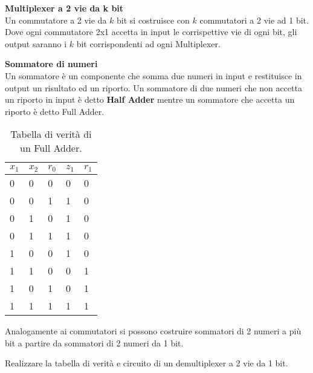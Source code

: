\begin{defn}
	\textbf{Multiplexer a 2 vie da k bit} \\
	Un commutatore a 2 vie da $ k $ bit si costruisce con $ k $ commutatori a 2
	vie ad 1 bit. Dove ogni commutatore 2x1 accetta in input le corrispettive
	vie di ogni bit, gli output saranno i $ k $ bit corrispondenti ad ogni
	Multiplexer.
	
\end{defn}

\begin{defn}
	\textbf{Sommatore di numeri} \\
	Un sommatore è un componente che somma due numeri in input e restituisce in
	output un risultato ed un riporto. Un sommatore di due numeri che non
	accetta un riporto in input è detto \textbf{Half Adder} mentre un sommatore
	che accetta un riporto è detto Full Adder.
	
	\begin{table}[H]
		\centering
		\caption{Tabella di verità di un Full Adder.}
		\label{tab:sum1bit}
		\begin{tabular}{|lll|l|l|}
			\hline
			$ x_{1} $ & $ x _{2} $ & $ r_0 $ & $ z_1 $ & $r_1$ \\ \hline
			0         & 0          & 0       & 0       & 0     \\
			0         & 0          & 1       & 1       & 0     \\
			0         & 1          & 0       & 1       & 0     \\
			0         & 1          & 1       & 1       & 0     \\
			1         & 0          & 0       & 1       & 0     \\
			1         & 1          & 0       & 0       & 1     \\
			1         & 0          & 1       & 0       & 1     \\
			1         & 1          & 1       & 1       & 1     \\ \hline
		\end{tabular}
	\end{table}
	
	
	Analogamente ai commutatori si possono costruire sommatori di 2 numeri a più
	bit a partire da sommatori di 2 numeri da 1 bit.
\end{defn}

\begin{exrc}
	Realizzare la tabella di verità e circuito di un demultiplexer a 2 vie da 1
	bit.
\end{exrc}

